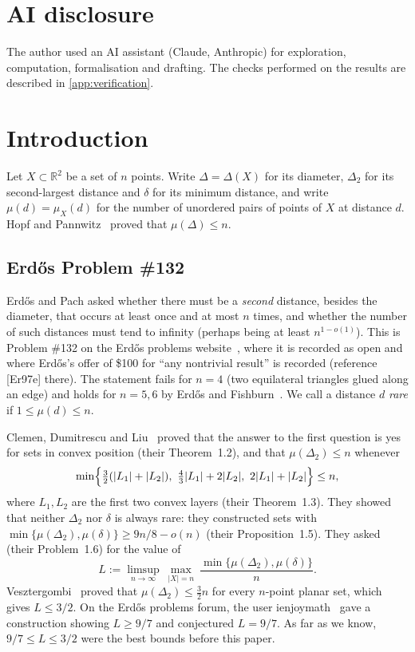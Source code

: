 \documentclass[11pt]{amsart}
\theoremstyle{definition}
\theoremstyle{remark}
\newcommand{\R}{\mathbb{R}}
\newcommand{\Dt}{\Delta_2}
\newcommand{\mult}{\mu}
\begin{document}
\maketitle

\section*{AI disclosure}
The author used an AI assistant (Claude, Anthropic) for exploration, computation, formalisation and drafting. The checks performed on the results are described in \cref{app:verification}.

\section{Introduction}\label{sec:intro}

Let $X\subset\R^2$ be a set of $n$ points. Write $\Delta=\Delta(X)$ for its diameter, $\Dt$ for its second-largest distance and $\delta$ for its minimum distance, and write $\mult(d)=\mult_X(d)$ for the number of unordered pairs of points of $X$ at distance $d$. Hopf and Pannwitz~\cite{HP34} proved that $\mult(\Delta)\le n$.

\subsection*{Erd\H{o}s Problem \#132}
Erd\H{o}s and Pach asked whether there must be a \emph{second} distance, besides the diameter, that occurs at least once and at most $n$ times, and whether the number of such distances must tend to infinity (perhaps being at least $n^{1-o(1)}$). This is Problem \#132 on the Erd\H{o}s problems website~\cite{EP132}, where it is recorded as open and where Erd\H{o}s's offer of \$100 for ``any nontrivial result'' is recorded (reference [Er97e] there). The statement fails for $n=4$ (two equilateral triangles glued along an edge) and holds for $n=5,6$ by Erd\H{o}s and Fishburn~\cite{EF95a}. We call a distance $d$ \emph{rare} if $1\le\mult(d)\le n$.

Clemen, Dumitrescu and Liu~\cite{CDL25} proved that the answer to the first question is yes for sets in convex position (their Theorem~1.2), and that $\mult(\Dt)\le n$ whenever
\begin{equation}\label{eq:cdl13}
\min\Bigl\{\tfrac32(|L_1|+|L_2|),\ \tfrac43|L_1|+2|L_2|,\ 2|L_1|+|L_2|\Bigr\}\le n,
\end{equation}
where $L_1,L_2$ are the first two convex layers (their Theorem~1.3). They showed that neither $\Dt$ nor $\delta$ is always rare: they constructed sets with $\min\{\mult(\Dt),\mult(\delta)\}\ge 9n/8-o(n)$ (their Proposition~1.5). They asked (their Problem~1.6) for the value of
\[
L:=\limsup_{n\to\infty}\ \max_{|X|=n}\ \frac{\min\{\mult(\Dt),\mult(\delta)\}}{n}.
\]
Vesztergombi~\cite{Ve87} proved that $\mult(\Dt)\le\frac32 n$ for every $n$-point planar set, which gives $L\le 3/2$. On the Erd\H{o}s problems forum, the user ienjoymath~\cite{ienjoymath} gave a construction showing $L\ge 9/7$ and conjectured $L=9/7$. As far as we know, $9/7\le L\le 3/2$ were the best bounds before this paper.
\end{document}
